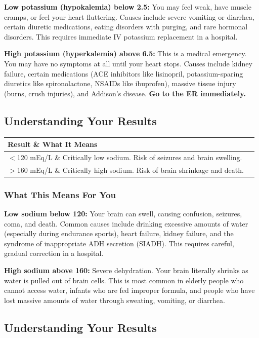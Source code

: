 \textbf{Low potassium (hypokalemia) below 2.5:} You may feel weak, have muscle cramps, or feel your heart fluttering. Causes include severe vomiting or diarrhea, certain diuretic medications, eating disorders with purging, and rare hormonal disorders. This requires immediate IV potassium replacement in a hospital.

\textbf{High potassium (hyperkalemia) above 6.5:} This is a medical emergency. You may have no symptoms at all until your heart stops. Causes include kidney failure, certain medications (ACE inhibitors like lisinopril, potassium-sparing diuretics like spironolactone, NSAIDs like ibuprofen), massive tissue injury (burns, crush injuries), and Addison's disease. \textbf{Go to the ER immediately.}

\subsection{Understanding Your Results}

\begin{longtable}{@{}ll@{}}
\toprule
\textbf{Result} \& \textbf{What It Means} \\
\midrule
$<$120 mEq/L \& Critically low sodium. Risk of seizures and brain swelling. \\
$>$160 mEq/L \& Critically high sodium. Risk of brain shrinkage and death. \\
\bottomrule
\end{longtable}

\subsubsection{What This Means For You}

\textbf{Low sodium below 120:} Your brain can swell, causing confusion, seizures, coma, and death. Common causes include drinking excessive amounts of water (especially during endurance sports), heart failure, kidney failure, and the syndrome of inappropriate ADH secretion (SIADH). This requires careful, gradual correction in a hospital.

\textbf{High sodium above 160:} Severe dehydration. Your brain literally shrinks as water is pulled out of brain cells. This is most common in elderly people who cannot access water, infants who are fed improper formula, and people who have lost massive amounts of water through sweating, vomiting, or diarrhea.

\subsection{Understanding Your Results}

